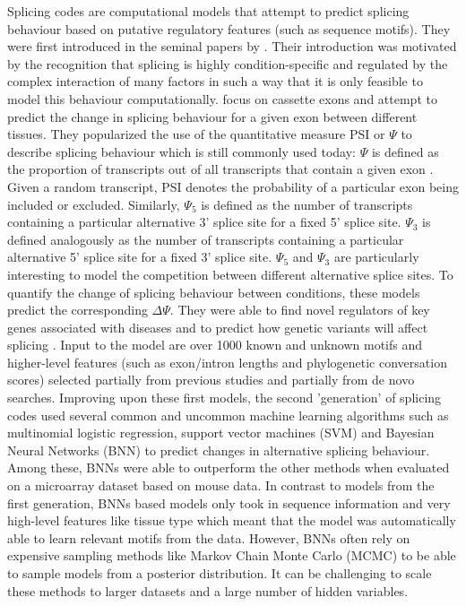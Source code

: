 Splicing codes are computational models that attempt to predict splicing behaviour based on putative regulatory features (such as sequence motifs).
They were first introduced in the seminal papers by \cite{barash2010a}\cite{barash2010b}. Their introduction was motivated by the recognition that splicing is highly condition-specific and regulated by the complex interaction of many factors in such a way that it is only feasible to model this behaviour computationally.
\cite{barash2010a} focus on cassette exons and attempt to predict the change in splicing behaviour for a given exon between different tissues. They popularized the use of the quantitative measure PSI or $\Psi$ to describe splicing behaviour which is still commonly used today:
$\Psi$ is defined as the proportion of transcripts out of all transcripts that contain a given exon \cite{psi}. Given a random transcript, PSI denotes the probability of a particular exon being included or excluded.
Similarly, $\Psi_5$ is defined as the number of transcripts containing a particular alternative 3' splice site for a fixed 5' splice site. $\Psi_3$ is defined analogously as the number of transcripts containing a particular alternative 5' splice site for a fixed 3' splice site. $\Psi_5$ and $\Psi_3$ are particularly interesting to model the competition between different alternative splice sites.
To quantify the change of splicing behaviour between conditions, these models predict the corresponding $\Delta \Psi$. They were able to find novel regulators of key genes associated with diseases and to predict how genetic variants will affect splicing \cite{splicingcodegood1} \cite{splicingcodegood2}.  Input to the model are over 1000 known and unknown motifs and higher-level features (such as exon/intron lengths and phylogenetic conversation scores) selected partially from previous studies and partially from de novo searches.
Improving upon these first models, the second 'generation' of splicing codes used several common and uncommon machine learning algorithms such as multinomial logistic regression, support vector machines (SVM) and Bayesian Neural Networks (BNN) to predict changes in alternative splicing behaviour. \cite{bnnsplicing} Among these, BNNs were able to outperform the other methods when evaluated on a microarray dataset based on mouse data. In contrast to models from the first generation, BNNs based models only took in sequence information and very high-level features like tissue type which meant that the model was automatically able to learn relevant motifs from the data.
However, BNNs often rely on expensive sampling methods like Markov Chain Monte Carlo (MCMC) to be able to sample models from a posterior distribution. It can be challenging to scale these methods to larger datasets and a large number of hidden variables.
